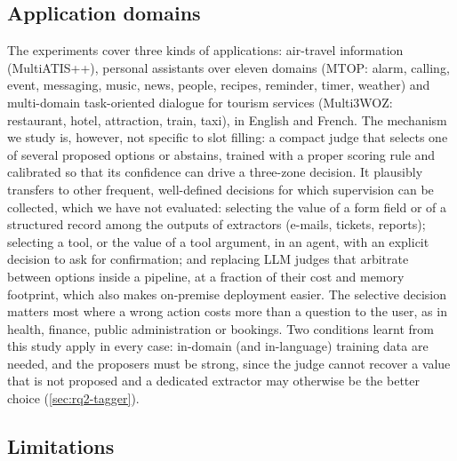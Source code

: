 \subsection{Application domains}
\label{sec:applications}

The experiments cover three kinds of applications: air-travel information (MultiATIS++), personal assistants over eleven domains (MTOP: alarm, calling, event, messaging, music, news, people, recipes, reminder, timer, weather) and multi-domain task-oriented dialogue for tourism services (Multi3WOZ: restaurant, hotel, attraction, train, taxi), in English and French. The mechanism we study is, however, not specific to slot filling: a compact judge that selects one of several proposed options or abstains, trained with a proper scoring rule and calibrated so that its confidence can drive a three-zone decision. It plausibly transfers to other frequent, well-defined decisions for which supervision can be collected, which we have not evaluated: selecting the value of a form field or of a structured record among the outputs of extractors (e-mails, tickets, reports); selecting a tool, or the value of a tool argument, in an agent, with an explicit decision to ask for confirmation; and replacing LLM judges that arbitrate between options inside a pipeline, at a fraction of their cost and memory footprint, which also makes on-premise deployment easier. The selective decision matters most where a wrong action costs more than a question to the user, as in health, finance, public administration or bookings. Two conditions learnt from this study apply in every case: in-domain (and in-language) training data are needed, and the proposers must be strong, since the judge cannot recover a value that is not proposed and a dedicated extractor may otherwise be the better choice (\cref{sec:rq2-tagger}).

\subsection{Limitations}
\label{sec:limitations}

